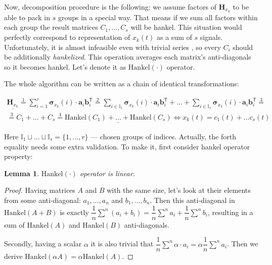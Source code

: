 \documentclass[referee, pdflatex, sn-mathphys-num]{sn-jnl}
\theoremstyle{definition}
\theoremstyle{plain}
\newtheorem{Lem}{Lemma}
\begin{document}
	Now, decomposition procedure is the following: we assume factors of $ \mathbf{H}_{x_k} $ to be able to pack in $ s $ groups in a special way. That means if we sum all factors within each group the result matrices $ C_1, \ldots, C_s $ will be hankel. This situation would perfectly correspond to representation of $ x_k(t) $ as a sum of $ s $ signals. Unfortunately, it is almost infeasible even with trivial series \cite{ecfb9dc578be43ae9ee8fc88b8ff9151}, so every $ C_i $ should be additionally \emph{hankelized}. This operation averages each matrix's anti-diagonals so it becomes hankel. Let's denote it as $ \text{Hankel}(\cdot) $ operator. 
	
	The whole algorithm can be written as a chain of identical transformations:
	
	\begin{multline}\label{eq:decomp_method_ideal}
		\underline{\mathbf{H}_{x_k}} \overset{1}{=} \sum\limits_{i = 1}^{r} \boldsymbol{\sigma}_{x_k}(i) \cdot \mathbf{a}_i  \mathbf{b}_i^{\mathsf{T}} \overset{2}{=} \sum\limits_{i \in \mathbb{I}_1} \boldsymbol{\sigma}_{x_k}(i) \cdot \mathbf{a}_i  \mathbf{b}_i^{\mathsf{T}} + \ldots + \sum\limits_{i \in \mathbb{I}_s} \boldsymbol{\sigma}_{x_k}(i) \cdot \mathbf{a}_i  \mathbf{b}_i^{\mathsf{T}} \overset{3}{=} \\ \overset{3}{=} C_1 + \ldots + C_s \overset{4}{=} \underline{\text{Hankel}(C_1) + \ldots + \text{Hankel}(C_s)}  \Leftrightarrow x_k(t) = c_1(t) + \ldots c_s(t)
	\end{multline}
	
	Here $ \mathbb{I}_1 \sqcup \ldots \sqcup \mathbb{I}_s = \{1, \ldots, r\} $ --- chosen groups of indices. Actually, the forth equality needs some extra validation. To make it, first consider hankel operator property:
	
	\begin{Lem}
		$ \text{Hankel}(\cdot) $ operator is linear.
	\end{Lem}
	
	\begin{proof}		
		Having matrices $ A $ and $ B $ with the same size, let's look at their elements from some anti-diagonal: $ a_1, \ldots, a_n $ and $ b_1, \ldots, b_n $. Then this anti-diagonal in $ \text{Hankel}(A + B) $ is exactly $ \dfrac{1}{n} \sum\limits^n (a_i + b_i) = \dfrac{1}{n} \sum\limits^n a_i + \dfrac{1}{n} \sum\limits^n b_i $, resulting in a sum of  $ \text{Hankel}(A) $ and $ \text{Hankel}(B) $ anti-diagonals.
		
		Secondly, having a scalar $ \alpha $ it is also trivial that $ \dfrac{1}{n} \sum\limits^n \alpha \cdot a_i = \alpha \dfrac{1}{n} \sum\limits^n a_i $. Then we derive $ \text{Hankel}(\alpha A) = \alpha \text{Hankel}(A) $.
	\end{proof}
	
\end{document}
